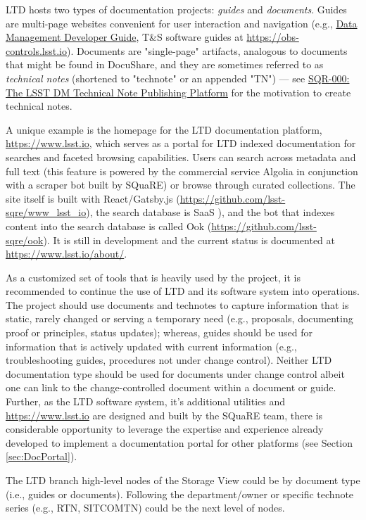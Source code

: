 LTD hosts two types of documentation projects: \emph{guides} and \emph{documents}.
Guides are multi-page websites convenient for user interaction and navigation (e.g., \href{developer.lsst.io}{Data Management Developer Guide}, T\&S software guides at \url{https://obs-controls.lsst.io}).
Documents are "single-page" artifacts, analogous to documents that might be found in DocuShare, and they are sometimes referred to as \emph{technical notes} (shortened to "technote" or an appended "TN") --- see \href{https://sqr-000.lsst.io}{SQR-000: The LSST DM Technical Note Publishing Platform} for the motivation to create technical notes. 

A unique example is the homepage for the LTD documentation platform, \url{https://www.lsst.io}, which serves as a portal for LTD indexed documentation for searches and faceted browsing capabilities. \citep{lsst.io-cite}
Users can search across metadata and full text (this feature is powered by the commercial service Algolia \citep{Algolia-cite} in conjunction with a scraper bot built by SQuaRE) or browse through curated collections.
The site itself is built with React/Gatsby.js (\url{https://github.com/lsst-sqre/www_lsst_io}), the search database is SaaS \citep{SaaS-cite}), and the bot that indexes content into the search database is called Ook (\url{https://github.com/lsst-sqre/ook}).
It is still in development and the current status is documented at \url{https://www.lsst.io/about/}.

As a customized set of tools that is heavily used by the project, it is recommended to continue the use of LTD and its software system into operations.
The project should use documents and technotes to capture information that is static, rarely changed or serving a temporary need (e.g., proposals, documenting proof or principles, status updates);
whereas, guides should be used for information that is actively updated with current information (e.g., troubleshooting guides, procedures not under change control).
Neither LTD documentation type should be used for documents under change control albeit one can link to the change-controlled document within a document or guide.
Further, as the LTD software system, it's additional utilities and \url{https://www.lsst.io} are designed and built by the SQuaRE team, there is considerable opportunity to leverage the expertise and experience already developed to implement a documentation portal for other platforms (see Section \ref{sec:DocPortal}).

The LTD branch high-level nodes of the Storage View could be by document type (i.e., guides or documents).
Following the department/owner or specific technote series (e.g., RTN, SITCOMTN) could be the next level of nodes.

